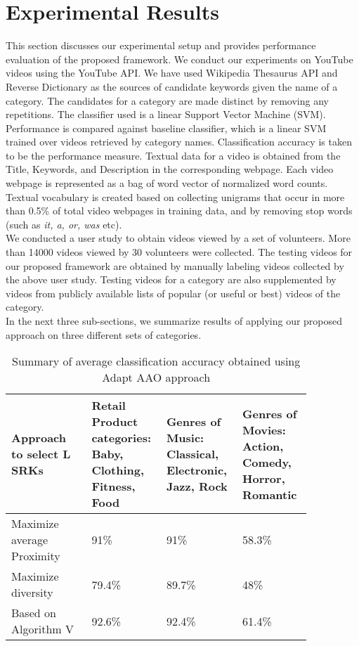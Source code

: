 \section{Experimental Results}
\label{sec:expt}
This section discusses our experimental setup and provides performance evaluation of the proposed framework. We conduct our experiments on YouTube videos using the YouTube API. We have used Wikipedia Thesaurus API \cite{nakayama2007wikipedia} and Reverse Dictionary \cite{ReverseDictionary} as the sources of candidate keywords given the name of a category. The candidates for a category are made distinct by removing any repetitions. The classifier used is a linear Support Vector Machine (SVM). Performance is compared against baseline classifier, which is a linear SVM trained over videos retrieved by category names. Classification accuracy is taken to be the performance measure. Textual data for a video is obtained from the Title, Keywords, and Description in the corresponding webpage. Each video webpage is represented as a bag of word vector of normalized word counts. Textual vocabulary is created based on collecting unigrams that occur in more than 0.5\% of total video webpages in training data, and by removing stop words (such as \textit{it, a, or, was} etc). \\
\indent      We conducted a user study to obtain videos viewed by a set of volunteers. More than 14000 videos viewed by 30 volunteers were collected. The testing videos for our proposed framework are obtained by manually labeling videos collected by the above user study. Testing videos for a category are also supplemented by videos from publicly available lists of popular (or useful or best) videos of the category.  \\
\indent      In the next three sub-sections, we summarize results of applying our proposed approach on three different sets of categories.

\begin{table}
\fontsize{8pt}{1em}\selectfont
\begin{center}
\caption{{Summary of average classification accuracy obtained using Adapt AAO approach}
\label{tab:SumAAOResults}}
\begin{tabular}{|p{0.25\linewidth}|p{0.20\linewidth}|p{0.20\linewidth}|p{0.20\linewidth}|}
		\hline
		\textbf{Approach to select L SRKs} & \textbf{Retail Product categories: Baby, Clothing, Fitness, Food} & \textbf{Genres of Music: Classical, Electronic, Jazz, Rock} & \textbf{Genres of Movies: Action, Comedy, Horror, Romantic} \\
		\hline
		Maximize average Proximity  & 91\%  & 91\% & 58.3\%  \\
		\hline
		Maximize diversity & 79.4\% & 89.7\%  &  48\%  \\
		\hline
		Based on Algorithm V & 92.6\%  & 92.4\% & 61.4\%  \\
		\hline
\end{tabular}
\end{center}
\end{table}

